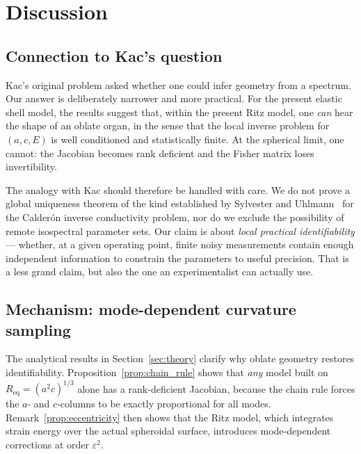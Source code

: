 \section{Discussion}\label{sec:discussion}

\subsection{Connection to Kac's question}

Kac's original problem asked whether one could infer geometry from a spectrum.
Our answer is deliberately narrower and more practical.  For the present
elastic shell model, the results suggest that, within the present Ritz model,
one \emph{can} hear the shape
of an oblate organ, in the sense that the local inverse problem for
$(a,c,E)$ is well conditioned and statistically finite.  At the spherical
limit, one cannot: the Jacobian becomes rank deficient and the Fisher matrix
loses invertibility.

The analogy with Kac should therefore be handled with care.  We do not prove a
global uniqueness theorem of the kind established by Sylvester and
Uhlmann~\cite{SylvesterUhlmann1987} for the Calder\'on inverse conductivity
problem, nor do we exclude the possibility of remote isospectral parameter sets.
Our claim is about \emph{local practical identifiability} --- whether, at a
given operating point, finite noisy measurements contain enough independent
information to constrain the parameters to useful precision.  That is a less
grand claim, but also the one an experimentalist can actually use.

\subsection{Mechanism: mode-dependent curvature sampling}

The analytical results in Section~\ref{sec:theory} clarify why oblate geometry
restores identifiability.  Proposition~\ref{prop:chain_rule} shows that \emph{any}
model built on $R_\mathrm{eq} = (a^2 c)^{1/3}$ alone has a rank-deficient
Jacobian, because the chain rule forces the $a$- and $c$-columns to be exactly
proportional for all modes.  Remark~\ref{prop:eccentricity} then shows
that the Ritz model, which integrates strain energy over the actual spheroidal
surface, introduces mode-dependent corrections at order $\varepsilon^2$.

